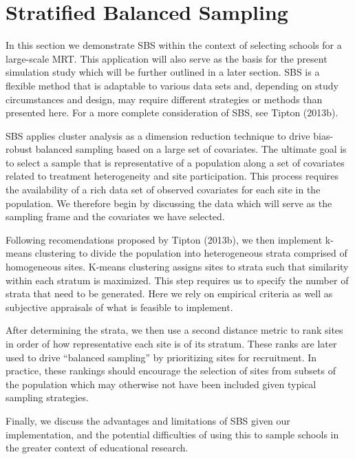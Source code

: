 \documentclass[man,floatsintext]{apa6}
\begin{document}
\hypertarget{stratified-balanced-sampling}{%
\section{Stratified Balanced Sampling}\label{stratified-balanced-sampling}}

In this section we demonstrate SBS within the context of selecting schools for a large-scale MRT. This application will also serve as the basis for the present simulation study which will be further outlined in a later section. SBS is a flexible method that is adaptable to various data sets and, depending on study circumstances and design, may require different strategies or methods than presented here. For a more complete consideration of SBS, see Tipton (2013b).

SBS applies cluster analysis as a dimension reduction technique to drive bias-robust balanced sampling based on a large set of covariates. The ultimate goal is to select a sample that is representative of a population along a set of covariates related to treatment heterogeneity and site participation. This process requires the availability of a rich data set of observed covariates for each site in the population. We therefore begin by discussing the data which will serve as the sampling frame and the covariates we have selected.

Following recomendations proposed by Tipton (2013b), we then implement k-means clustering to divide the population into heterogeneous strata comprised of homogeneous sites. K-means clustering assigns sites to strata such that similarity within each stratum is maximized. This step requires us to specify the number of strata that need to be generated. Here we rely on empirical criteria as well as subjective appraisals of what is feasible to implement.

After determining the strata, we then use a second distance metric to rank sites in order of how representative each site is of its stratum. These ranks are later used to drive \enquote{balanced sampling} by prioritizing sites for recruitment. In practice, these rankings should encourage the selection of sites from subsets of the population which may otherwise not have been included given typical sampling strategies.

Finally, we discuss the advantages and limitations of SBS given our implementation, and the potential difficulties of using this to sample schools in the greater context of educational research.
\end{document}
